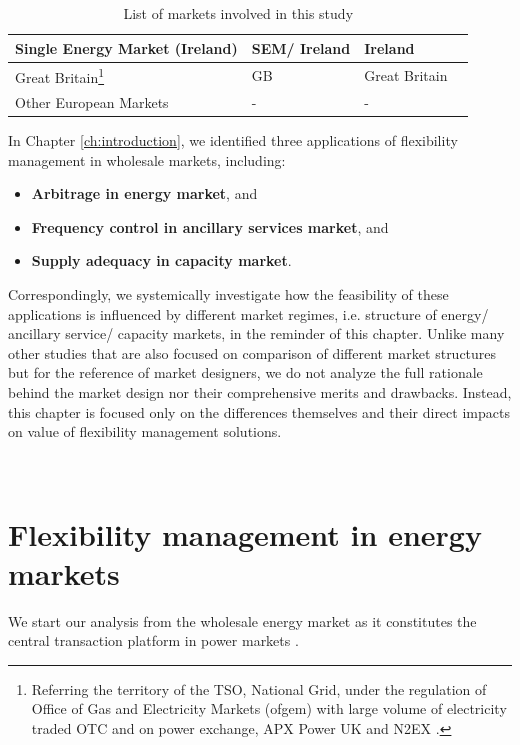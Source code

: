 \begin{table}[h!]
\begin{tabular}{L{5cm} l l l}
		\hline
		Single Energy Market (Ireland) & SEM/ Ireland & Ireland & \cite{FrontierEconomics2016,Cochran2013}\\
		\hline
		Great Britain\footnote{Referring the territory of the TSO, National Grid, under the regulation of Office of Gas and Electricity Markets (ofgem) with large volume of electricity traded OTC and on power exchange, APX Power UK and N2EX .} & GB & Great Britain & \cite{Rebours2009,FrontierEconomics2016,ofgem_cm,ofgem_m,EnergyUK2017} \\
		\hline
		Other European Markets & - & - & \cite{FrontierEconomics2016}\\
		\hline
		\hline
	\end{tabular}
	\caption{List of markets involved in this study} \label{tab:markets}
\end{table}

In Chapter \ref{ch:introduction}, we identified three applications of flexibility management in wholesale markets, including:

\begin{itemize}
	\item \textbf{Arbitrage in energy market}, and
	\item \textbf{Frequency control in ancillary services market}, and
	\item \textbf{Supply adequacy in capacity market}. 
\end{itemize}

Correspondingly, we systemically investigate how the feasibility of these applications is influenced by different market regimes, i.e. structure of energy/ ancillary service/ capacity markets, in the reminder of this chapter. Unlike many other studies that are also focused on comparison of different market structures but for the reference of market designers, we do not analyze the full rationale behind the market design nor their comprehensive merits and drawbacks. Instead, this chapter is focused only on the differences themselves and their direct impacts on value of flexibility management solutions.


~\newpage

\section{Flexibility management in energy markets}
\label{sec:market-energy}
We start our analysis from the wholesale energy market as it constitutes the central transaction platform in power markets \cite{Cochran2013}. 

